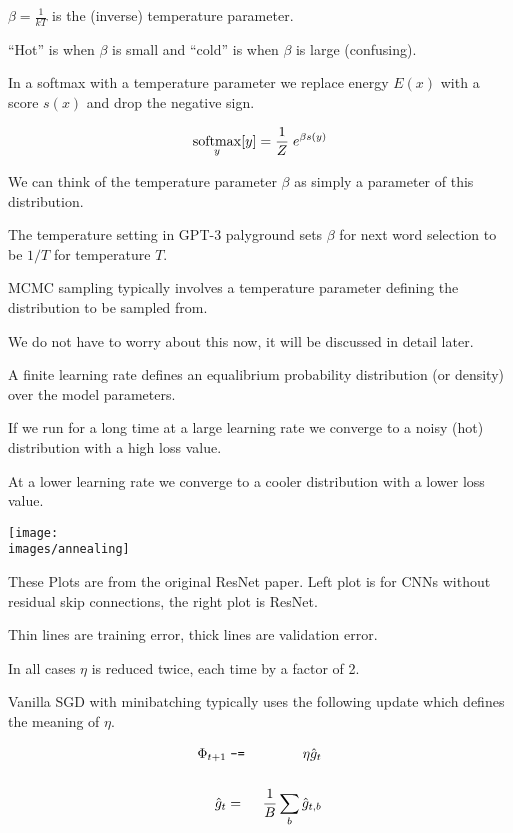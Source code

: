 {\vfill

$\beta = \frac{1}{kT}$ is the (inverse) temperature parameter.

\vfill
``Hot'' is when $\beta$ is small and ``cold'' is when $\beta$ is large (confusing).


In a softmax with a temperature parameter we replace energy $E(x)$ with a score $s(x)$ and drop the negative sign.

$$\operatorname*{softmax}_y[y] = \frac{1}{Z}\;e^{\beta s(y)}$$

\vfill
We can think of the temperature parameter $\beta$ as simply a parameter of this distribution.

\vfill
The temperature setting in GPT-3 palyground sets $\beta$ for next word selection to be $1/T$ for temperature $T$.


MCMC sampling typically involves a temperature parameter defining the distribution to be sampled from.

\vfill
We do not have to worry about this now, it will be discussed in detail later.


A finite learning rate defines an equalibrium probability distribution (or density) over the model parameters.

\vfill
If we run for a long time at a large learning rate we converge to a noisy (hot) distribution with a high loss value.

\vfill
At a lower learning rate we converge to a cooler distribution with a lower loss value.


\centerline{\texttt{[image: \\images/annealing]}}

\vfill
These Plots are from the original ResNet paper.  Left plot is for CNNs without residual skip connections, the right plot is ResNet.

\vfill
Thin lines are training error, thick lines are validation error.

\vfill
In all cases $\eta$ is reduced twice, each time by a factor of 2.


Vanilla SGD with minibatching typically uses the following update which defines the meaning of $\eta$.

\begin{eqnarray*}
\Phi_{t+1} & \;\mbox{\tt -=}\; & \eta \hat{g}_t \\
\\
\hat{g}_t & = & \frac{1}{B} \sum_b \hat{g}_{t,b}
\end{eqnarray*}

}
